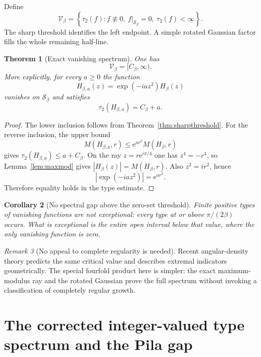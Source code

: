 \documentclass[11pt,oneside]{article}
\newtheorem{theorem}{Theorem}[section]
\newtheorem{corollary}[theorem]{Corollary}
\theoremstyle{definition}
\theoremstyle{remark}
\newtheorem{remark}[theorem]{Remark}
\newcommand{\Sbeta}{\mathcal S_\beta}
\newcommand{\Vclass}{\mathcal V}
\newcommand{\ee}{\mathrm e}
\newcommand{\Cbeta}{C_\beta}
\begin{document}
Define
\[
 \Vclass_\beta=
 \left\{\tau_2(f):
 f\not\equiv0,\ f|_{\Sbeta}=0,\ \tau_2(f)<\infty\right\}.
\]
The sharp threshold identifies the left endpoint.  A simple rotated Gaussian factor fills
the whole remaining half-line.

\begin{theorem}[Exact vanishing spectrum]
\label{thm:vanishingspectrum}
One has
\begin{equation}
 \Vclass_\beta=[\Cbeta,\infty).
 \label{eq:vanishingspectrum}
\end{equation}
More explicitly, for every $a\ge0$ the function
\begin{equation}
 H_{\beta,a}(z)=\exp(-ia z^2)H_\beta(z)
 \label{eq:Hba}
\end{equation}
vanishes on $\Sbeta$ and satisfies
\[
 \tau_2(H_{\beta,a})=\Cbeta+a.
\]
\end{theorem}

\begin{proof}
The lower inclusion follows from Theorem~\ref{thm:sharpthreshold}.  For the reverse
inclusion, the upper bound
\[
 M(H_{\beta,a},r)\le \ee^{a r^2}M(H_\beta,r)
\]
gives $\tau_2(H_{\beta,a})\le a+\Cbeta$.  On the ray
$z=r\ee^{i\pi/4}$ one has $z^4=-r^4$, so Lemma~\ref{lem:maxmod} gives
$|H_\beta(z)|=M(H_\beta,r)$.  Also $z^2=ir^2$, hence
\[
 |\exp(-ia z^2)|=\ee^{a r^2}.
\]
Therefore equality holds in the type estimate.
\end{proof}

\begin{corollary}[No spectral gap above the zero-set threshold]
Finite positive types of vanishing functions are not exceptional: every type at or above
$\pi/(2\beta)$ occurs.  What is exceptional is the entire open interval below that value,
where the only vanishing function is zero.
\end{corollary}

\begin{remark}[No appeal to complete regularity is needed]
Recent angular-density theory predicts the same critical value and describes extremal
indicators geometrically.  The special fourfold product here is simpler: the exact
maximum-modulus ray and the rotated Gaussian prove the full spectrum without invoking a
classification of completely regular growth.
\end{remark}

\section{The corrected integer-valued type spectrum and the Pila gap}
\label{sec:pilagap}
\end{document}
